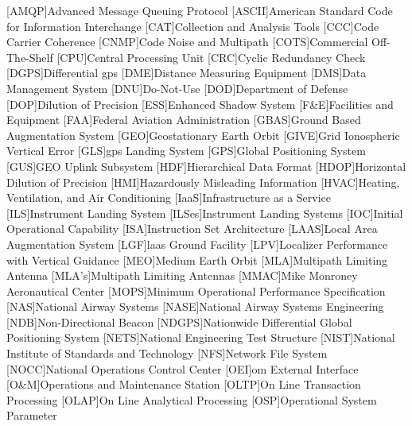 \begin{acronym}[WAAS]
[AMQP]{Advanced Message Queuing Protocol}
[ASCII]{American Standard Code for Information Interchange}
[CAT]{Collection and Analysis Tools}
[CCC]{Code Carrier Coherence}
[CNMP]{Code Noise and Multipath}
[COTS]{Commercial Off-The-Shelf}
[CPU]{Central Processing Unit}
[CRC]{Cyclic Redundancy Check}
[DGPS]{Differential \ac{gps}}
[DME]{Distance Measuring Equipment}
[DMS]{Data Management System}
[DNU]{Do-Not-Use}
[DOD]{Department of Defense}
[DOP]{Dilution of Precision}
[ESS]{Enhanced Shadow System}
[F\&E]{Facilities and Equipment}
[FAA]{Federal Aviation Administration}
[GBAS]{Ground Based Augmentation System}
[GEO]{Geostationary Earth Orbit}
[GIVE]{Grid Ionospheric Vertical Error}
[GLS]{\ac{gps} Landing System}
[GPS]{Global Positioning System}
[GUS]{GEO Uplink Subsystem}
[HDF]{Hierarchical Data Format}
[HDOP]{Horizontal Dilution of Precision}
[HMI]{Hazardously Misleading Information}
[HVAC]{Heating, Ventilation, and Air Conditioning}
[IaaS]{Infrastructure as a Service}
[ILS]{Instrument Landing System}
[ILSes]{Instrument Landing Systems}
[IOC]{Initial Operational Capability}
[ISA]{Instruction Set Architecture}
[LAAS]{Local Area Augmentation System}
[LGF]{\ac{laas} Ground Facility}
[LPV]{Localizer Performance with Vertical Guidance}
[MEO]{Medium Earth Orbit}
[MLA]{Multipath Limiting Antenna}
[MLA's]{Multipath Limiting Antennas}
[MMAC]{Mike Monroney Aeronautical Center}
[MOPS]{Minimum Operational Performance Specification}
[NAS]{National Airway Systems}
[NASE]{National Airway Systems Engineering}
[NDB]{Non-Directional Beacon}
[NDGPS]{Nationwide Differential Global Positioning System}
[NETS]{National Engineering Test Structure}
[NIST]{National Institute of Standards and Technology}
[NFS]{Network File System}
[NOCC]{National Operations Control Center}
[OEI]{\ac{om} External Interface}
[O\&M]{Operations and Maintenance Station}
[OLTP]{On Line Transaction Processing}
[OLAP]{On Line Analytical Processing}
[OSP]{Operational System Parameter}

\end{acronym}
